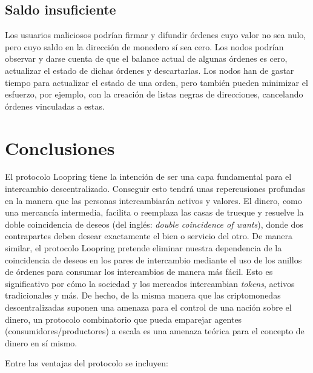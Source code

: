 \documentclass[UTF8,nofonts]{article}
\begin{document}
\begin{multicols}{2}
\subsection{Saldo insuficiente}
Los usuarios maliciosos podrían firmar y difundir órdenes cuyo valor no sea nulo, pero cuyo saldo en la dirección de monedero sí sea cero. Los nodos podrían observar y darse cuenta de que el balance actual de algunas órdenes es cero, actualizar el estado de dichas órdenes y descartarlas. Los nodos han de gastar tiempo para actualizar el estado de una orden, pero también pueden minimizar el esfuerzo, por ejemplo, con la creación de listas negras de direcciones, cancelando órdenes vinculadas a estas.

\section{Conclusiones}

El protocolo Loopring tiene la intención de ser una capa fundamental para el intercambio descentralizado. Conseguir esto tendrá unas repercusiones profundas en la manera que las personas intercambiarán activos y valores. El dinero, como una mercancía intermedia, facilita o reemplaza las casas de trueque y resuelve la doble coincidencia de deseos \cite{unenumerated2006} (del inglés: \textit{double coincidence of wants}), donde dos contrapartes deben desear exactamente el bien o servicio del otro. De manera similar, el protocolo Loopring pretende eliminar nuestra dependencia de la coincidencia de deseos en los pares de intercambio mediante el uso de los anillos de órdenes para consumar los intercambios de manera más fácil. Esto es significativo por cómo la sociedad y los mercados intercambian \textit{tokens}, activos tradicionales y más. De hecho, de la misma manera que las criptomonedas descentralizadas suponen una amenaza para el control de una nación sobre el dinero, un protocolo combinatorio que pueda emparejar agentes (consumidores/productores) a escala es una amenaza teórica para el concepto de dinero en sí mismo.

Entre las ventajas del protocolo se incluyen:


\end{multicols}
\end{document}
